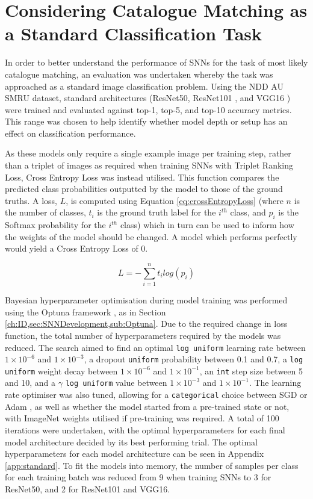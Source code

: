 \section{Considering Catalogue Matching as a Standard Classification Task}\label{ch:SNNEvaluation,sec:comparsion}

In order to better understand the performance of SNNs for the task of most likely catalogue matching, an evaluation was undertaken whereby the task was approached as a standard image classification problem. Using the NDD AU SMRU dataset, standard architectures (ResNet50, ResNet101 \cite{he_deep_2015}, and VGG16 \cite{simonyan_very_2015}) were trained and evaluated against top-1, top-5, and top-10 accuracy metrics. This range was chosen to help identify whether model depth or setup has an effect on classification performance. 

As these models only require a single example image per training step, rather than a triplet of images as required when training SNNs with Triplet Ranking Loss, Cross Entropy Loss was instead utilised. This function compares the predicted class probabilities outputted by the model to those of the ground truths. A loss, $L$, is computed using Equation \ref{eq:crossEntropyLoss} (where $n$ is the number of classes, $t_{i}$ is the ground truth label for the $i^{th}$ class, and $p_{i}$ is the Softmax probability for the $i^{th}$ class) which in turn can be used to inform how the weights of the model should be changed. A model which performs perfectly would yield a Cross Entropy Loss of 0. 

\begin{equation}
	\label{eq:crossEntropyLoss}
	L = -\sum_{i=1}^{n} t_{i} log(p_{i})
\end{equation}

Bayesian hyperparameter optimisation during model training was performed using the Optuna framework \cite{akiba_optuna_2019}, as in Section \ref{ch:ID,sec:SNNDevelopment,sub:Optuna}. Due to the required change in loss function, the total number of hyperparameters required by the models was reduced. The search aimed to find an optimal \texttt{log uniform} learning rate between $1\times10^{-6}$ and $1\times10^{-3}$, a dropout \cite{srivastava_dropout:_2014} \texttt{uniform} probability between 0.1 and 0.7, a \texttt{log uniform} weight decay between $1\times10^{-6}$ and $1\times10^{-1}$, an \texttt{int} step size between 5 and 10, and a $\gamma$ \texttt{log uniform} value between $1\times10^{-3}$ and $1\times10^{-1}$. The learning rate optimiser was also tuned, allowing for a \texttt{categorical} choice between SGD or Adam \cite{kingma_adam:_2014}, as well as whether the model started from a pre-trained state or not, with ImageNet \cite{krizhevsky_learning_2009} weights utilised if pre-training was required. A total of 100 iterations were undertaken, with the optimal hyperparameters for each final model architecture decided by its best performing trial. The optimal hyperparameters for each model architecture can be seen in Appendix \ref{app:standard}. To fit the models into memory, the number of samples per class for each training batch was reduced from 9 when training SNNs to 3 for ResNet50, and 2 for ResNet101 and VGG16.

